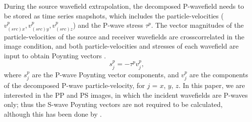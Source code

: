 \documentclass[manuscript,ulem,graphix,revised]{geophysics}
\begin{document}
During the source wavefield extrapolation, the decomposed P-wavefield needs to be stored as time series snapshots, which includes the particle-velocities ($v^p_{(src)x}, v^p_{(src)y},v^p_{(src)z}$) and the P-wave stress $\tau^p$. The vector magnitudes of the particle-velocities of the source and receiver wavefields are crosscorrelated in the image condition, and both particle-velocities and stresses of each wavefield are input to obtain Poynting vectors \citep{cerveny01}.%
%
\begin{equation}
s^{p}_j=-\tau^p v^p_j,
\label{eqn:poynting_p}
\end{equation}
where 
$s^{p}_j$ are the P-wave Poynting vector components, and
$v^p_j$ are the components of the decomposed P-wave particle-velocity, for $j$ = $x$, $y$, $z$. In this paper, we are interested in the PP and PS images, in which the incident wavefields are P-waves only; thus the S-wave Poynting vectors are not required to be calculated, although this has been done by \citet{wenlong_pv16}.
\end{document}
